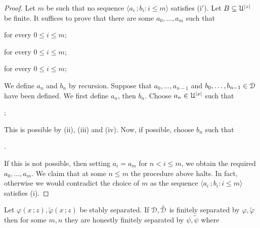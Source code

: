 \documentclass{amsproc}
\begin{document}
{\begin{lemma}
  
\end{lemma}

\begin{proof}
  Let $m$ be such that no sequence $\langle a_i\,;b_i : i\le m\rangle$ satisfies (i$'$).
  Let $B\subseteq{\EuScript U}^{|z|}$ be finite.
  It suffices to prove that there are some $a_0,\dots,a_m$ such that 
  
  \hfill for every $0\le i\le m$;
  
  \hfill for every $0\le i\le m$;

  \hfill for every $0\le i\le m$;


  We define $a_n$ and $b_n$ by recursion.
  Suppose that $a_0,\dots,a_{n-1}$ and $b_0,\dots,b_{n-1}\in{\EuScript D}$ have been defined.
  We first define $a_n$, then $b_n$. 
  Choose $a_n\in{\EuScript U}^{|x|}$ such that 
  
  ;
  


  This is possible by (ii), (iii) and (iv).
  Now, if possible, choose $b_n$ such that

  .

  If this is not possible, then setting $a_i=a_m$ for $n<i\le m$, we obtain the required $a_0,\dots,a_m$.
  We claim that at some $n\le m$ the procedure above halts.
  In fact, otherwise we would contradict the choice of $m$ as the sequence $\langle a_i\,;b_i : i\le m\rangle$ satisfies (i).
\end{proof}

\begin{theorem}\label{thm_stability}
  Let $\varphi(x\,;z),\tilde\varphi(x\,;z)$ be stably separated.
  If ${\EuScript D},\tilde{\EuScript D}$ is finitely separated by $\varphi,\tilde\varphi$ then for some $m,n$ they are honestly finitely separated by $\psi,\tilde\psi$ where 
  

\end{theorem}}
\end{document}

